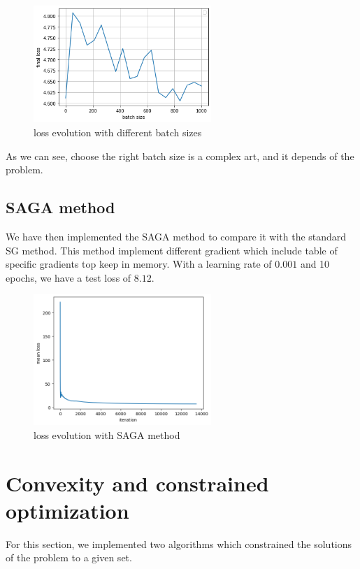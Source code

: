 \documentclass{article}
\begin{document}
    \begin{figure}[!h]
    \centering
    \includegraphics[width=0.6\textwidth]{images/sg2.png}
    \caption{loss evolution with different batch sizes}
    \label{fig:sg2}
    \end{figure}      

    As we can see, choose the right batch size is a complex art, and it depends of the problem.

    \subsection{SAGA method}

    We have then implemented the SAGA method to compare it with the standard SG method. This method implement different gradient which include table of specific gradients top keep in memory. With a learning rate of $0.001$ and 10 epochs, we have a test loss of $8.12$.

    \begin{figure}[!h]
    \centering
    \includegraphics[width=0.6\textwidth]{images/part3_SAGA.png}
    \caption{loss evolution with SAGA method}
    \label{fig:sg3}
    \end{figure}      

    \newpage

\section{Convexity and constrained optimization}
    For this section, we implemented two algorithms which constrained the solutions of the problem to a given set. 
    
\end{document}
